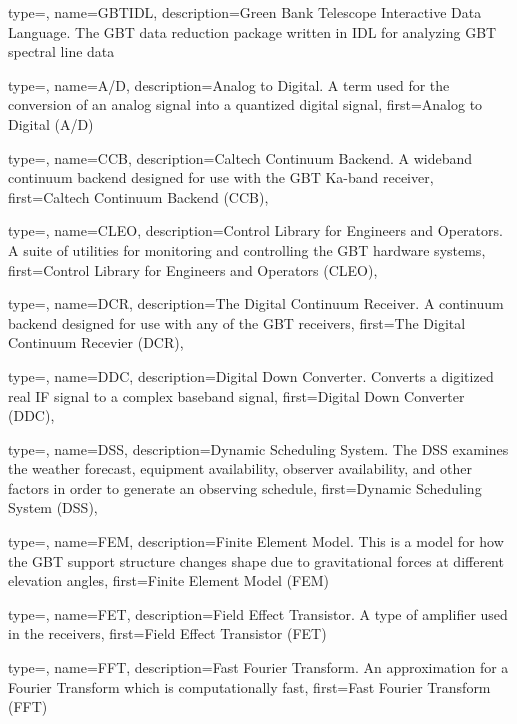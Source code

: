 {
  type=\acronymtype,
  name={GBTIDL},
  description={Green Bank Telescope Interactive Data Language.
The GBT data reduction package written in \gls{IDL} for
analyzing GBT spectral line data}
} 

{
  type=\acronymtype,
  name={A/D},
  description={Analog to Digital.
A term used for the conversion of an analog signal into 
a quantized digital signal},
  first={Analog to Digital (A/D)}} 

{
  type=\acronymtype,
  name={CCB},
  description={Caltech Continuum Backend.
A wideband continuum backend designed for use with the GBT 
Ka-band receiver},
  first={Caltech Continuum Backend (CCB)},
} 


{
  type=\acronymtype,
  name={CLEO},
  description={Control Library for Engineers and Operators.
A suite of utilities for monitoring and controlling the GBT
hardware systems},
  first={Control Library for Engineers and Operators (CLEO)},
} 

{
  type=\acronymtype,
  name={DCR},
  description={The Digital Continuum Receiver. A continuum backend designed
               for use with any of the GBT receivers},
  first={The Digital Continuum Recevier (DCR)},
} 

{
  type=\acronymtype,
  name={DDC},
  description={Digital Down Converter.
Converts a digitized real IF signal to a complex baseband signal},
  first={Digital Down Converter (DDC)},
} 

{
  type=\acronymtype,
  name={DSS},
  description={Dynamic Scheduling System.
The DSS examines the weather forecast, equipment
               availability, observer availability, and other factors
               in order to generate an observing schedule},
  first={Dynamic Scheduling System (DSS)},
}

{
  type=\acronymtype,
  name={FEM},
  description={Finite Element Model.
This is a model for how the GBT support structure changes 
shape due to gravitational forces at different elevation angles},
  first={Finite Element Model (FEM)}
}

{
  type=\acronymtype,
  name={FET},
  description={Field Effect Transistor.
A type of amplifier used in the receivers},
  first={Field Effect Transistor (FET)}
}

{
  type=\acronymtype,
  name={FFT},
  description={Fast Fourier Transform.
An approximation for a Fourier Transform which is computationally 
fast},
  first={Fast Fourier Transform (FFT)}
}

